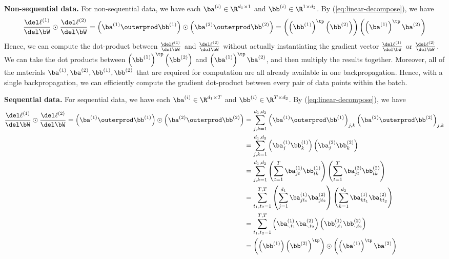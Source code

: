 \textbf{Non-sequential data.} 
For non-sequential data, we have each $\ba^{(i)} \in \R^{d_1 \times 1}$ and $\bb^{(i)} \in \R^{1 \times d_2}$. 
By (\ref{eq:linear-decompose}), we have 
\begin{align*}
\frac{\del \ell^{(1)}}{\del \bW}
\odot \frac{\del \ell^{(2)}}{\del \bW}
= 
\left( \ba^{(1)} \outerprod \bb^{(1)} \right) \odot 
\left( \ba^{(2)} \outerprod \bb^{(2)} \right)
=
\left(\left(\bb^{(1)}\right)^{\tp} \left(\bb^{(2)}\right) \right)
\left( \left( \ba^{(1)} \right)^\tp \ba^{(2)} \right)
\end{align*}
Hence, we can compute the dot-product between $\frac{\del \ell^{(1)}}{\del \bW}$ and $\frac{\del \ell^{(2)}}{\del \bW}$ without actually instantiating the gradient vector $\frac{\del \ell^{(1)}}{\del \bW}$ or $\frac{\del \ell^{(2)}}{\del \bW}$. 
We can take the dot products between $\left(\bb^{(1)}\right)^{\tp} \left(\bb^{(2)}\right)$ and $\left( \ba^{(1)} \right)^\tp \ba^{(2)}$, and then multiply the results together. 
Moreover, all of the materials $\ba^{(1)}, \ba^{(2)}, \bb^{(1)}, \bb^{(2)}$ that are required for computation are all already available in one backpropagation. 
Hence, with a single backpropagation, we can efficiently compute the gradient dot-product between every pair of data points within the batch. 

\textbf{Sequential data.} 
For sequential data, we have each $\ba^{(i)} \in \R^{d_1 \times T}$ and $\bb^{(i)} \in \R^{T \times d_2}$. 
By (\ref{eq:linear-decompose}), we have 
\begin{align*}
\frac{\del \ell^{(1)}}{\del \bW}
\odot \frac{\del \ell^{(2)}}{\del \bW}
= 
\left( \ba^{(1)} \outerprod \bb^{(1)} \right) \odot 
\left( \ba^{(2)} \outerprod \bb^{(2)} \right) 
&= \sum_{j, k = 1}^{d_1, d_2} \left( \ba^{(1)} \outerprod \bb^{(1)} \right)_{j, k} \left( \ba^{(2)} \outerprod \bb^{(2)} \right)_{j, k} \\
&= \sum_{j, k = 1}^{d_1, d_2} \left( \ba^{(1)}_{j} \bb^{(1)}_k \right) \left( \ba^{(2)}_{j} \bb^{(2)}_{k} \right) \\
&= \sum_{j, k = 1}^{d_1, d_2} \left( \sum_{t=1}^T \ba^{(1)}_{jt} \bb^{(1)}_{tk} \right) \left( \sum_{t=1}^T \ba^{(2)}_{jt} \bb^{(2)}_{tk} \right) \\
&= \sum_{t_1, t_2 = 1}^{T, T} \left(
\sum_{j=1}^{d_1} \ba^{(1)}_{j t_1} \ba^{(2)}_{j t_2} 
\right) \left(
\sum_{k=1}^{d_2} \ba^{(1)}_{k t_1} \ba^{(2)}_{k t_2} 
\right) \\
&= \sum_{t_1, t_2 = 1}^{T, T} \left( \ba^{(1)}_{\cdot, t_1} \ba^{(2)}_{\cdot, t_2} \right) \left( \bb^{(1)}_{\cdot, t_1} \bb^{(2)}_{\cdot, t_2} \right) \\
&=
\left(\left(\bb^{(1)}\right) \left(\bb^{(2)}\right)^{\tp} \right) \odot \left( \left( \ba^{(1)} \right)^\tp \ba^{(2)} \right)
\end{align*}


